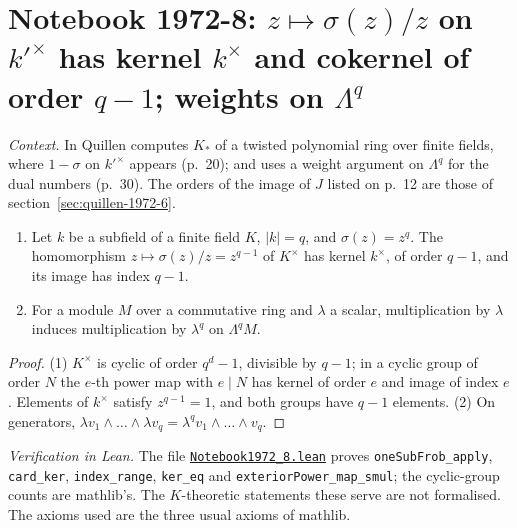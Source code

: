 \section[Notebook 1972-8: $1 - \sigma$ on $k'^\times$; weights on $\Lambda^q$]{Notebook 1972-8: $z \mapsto \sigma(z)/z$ on $k'^\times$ has kernel $k^\times$ and cokernel of order $q - 1$; weights on $\Lambda^q$\protect{}}\label{sec:quillen-1972-8}

\emph{Context.} In  Quillen computes $K_*$ of a twisted polynomial ring over finite fields, where $1 - \sigma$ on $k'^\times$ appears (p.~20); and uses a weight argument on $\Lambda^q$ for the dual numbers (p.~30). The orders of the image of $J$ listed on p.~12 are those of section~\ref{sec:quillen-1972-6}.

\begin{encadre}
\begin{theoreme}\label{thm:quillen-1972-8}\leavevmode
\begin{enumerate}
\item Let $k$ be a subfield of a finite field $K$, $|k| = q$, and $\sigma(z) = z^q$. The homomorphism $z \mapsto \sigma(z)/z = z^{q-1}$ of $K^\times$ has kernel $k^\times$, of order $q - 1$, and its image has index $q - 1$.
\item For a module $M$ over a commutative ring and $\lambda$ a scalar, multiplication by $\lambda$ induces multiplication by $\lambda^q$ on $\Lambda^qM$.
\end{enumerate}
\end{theoreme}
\end{encadre}

\begin{proof}
(1) $K^\times$ is cyclic of order $q^d - 1$, divisible by $q - 1$; in a cyclic group of order $N$ the $e$-th power map with $e \mid N$ has kernel of order $e$ and image of index $e$. Elements of $k^\times$ satisfy $z^{q-1} = 1$, and both groups have $q - 1$ elements. (2) On generators, $\lambda v_1 \wedge \dots \wedge \lambda v_q = \lambda^q v_1 \wedge \dots \wedge v_q$.
\end{proof}

\emph{Verification in Lean.} The file \href{\leanblobmain/Notebook1972_8.lean}{\texttt{Notebook1972\_8.\allowbreak{}lean}} proves \texttt{oneSubFrob\_apply}, \texttt{card\_ker}, \texttt{index\_range}, \texttt{ker\_eq} and \texttt{exteriorPower\_map\_smul}; the cyclic-group counts are mathlib's. The $K$-theoretic statements these serve are not formalised. The axioms used are the three usual axioms of mathlib.

